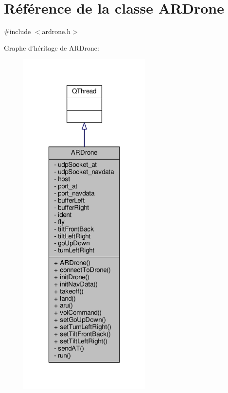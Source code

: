 \hypertarget{class_a_r_drone}{\section{Référence de la classe A\-R\-Drone}
\label{class_a_r_drone}
}


{\ttfamily \#include $<$ardrone.\-h$>$}



Graphe d'héritage de A\-R\-Drone\-:
\nopagebreak
\begin{figure}[H]
\begin{center}
\leavevmode
\includegraphics[width=188pt]{class_a_r_drone__inherit__graph}
\end{center}
\end{figure}


